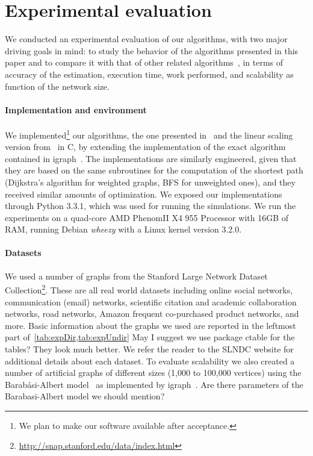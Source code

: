 \section{Experimental evaluation}\label{sec:exper}
We conducted an experimental evaluation of our algorithms, with two major
driving goals in mind: to study the behavior of the algorithms presented in this
paper and to compare it with that of other related
algorithms~\citep{Brandes01,BrandesP07,JacobKLPT05,GeisbergerSS08}, in terms of
accuracy of the estimation, execution time, work performed, and scalability as
function of the network size. 

\paragraph{Implementation and environment}
We implemented\footnote{We plan to make our software available after
acceptance.} our algorithms, the one presented in~\citep{BrandesP07,JacobKLPT05}
and the linear scaling version from~\citep{GeisbergerSS08} in C, by extending
the implementation of the exact algorithm~\citep{Brandes01} contained in
igraph~\citep{igraph}. The implementations are similarly engineered, given that
they are based on the same subroutines for the computation of the shortest path
(Dijkstra's algorithm for weighted graphs, BFS for unweighted ones), and they
received similar amounts of optimization. We exposed our implementations through
Python 3.3.1, which was used for running the simulations. We run the experiments
on a quad-core AMD Phenom\texttrademark II X4 955 Processor with 16GB of RAM,
running Debian \emph{wheezy} with a Linux kernel version 3.2.0.

\paragraph{Datasets} We used a number of graphs from the Stanford Large
Network Dataset
Collection\footnote{\url{http://snap.stanford.edu/data/index.html}}. These are
all real world datasets including online social networks, communication (email)
networks, scientific citation and academic collaboration networks, road
networks, Amazon frequent co-purchased product networks, and more. Basic
information about the graphs we used are reported in the leftmost part
of~\cref{tab:expDir,tab:expUndir} \XXX May I suggest we use package
ctable for the tables? They look much better. We refer the
reader to the SLNDC website for additional details about each dataset. 
To evaluate scalability we also created a number of artificial graphs of
different sizes (1,000 to 100,000 vertices) using the Barab\'asi-Albert
model~\citep{BarabasiA99} as implemented by igraph~\citep{igraph}. \XXX Are
there parameters of the Barabasi-Albert model we should mention?

